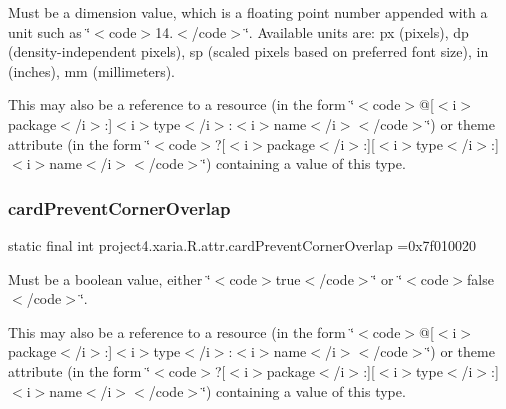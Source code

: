 Must be a dimension value, which is a floating point number appended with a unit such as \char`\"{}$<$code$>$14.\+5sp$<$/code$>$\char`\"{}. Available units are\+: px (pixels), dp (density-\/independent pixels), sp (scaled pixels based on preferred font size), in (inches), mm (millimeters). 

This may also be a reference to a resource (in the form \char`\"{}$<$code$>$@\mbox{[}$<$i$>$package$<$/i$>$\+:\mbox{]}$<$i$>$type$<$/i$>$\+:$<$i$>$name$<$/i$>$$<$/code$>$\char`\"{}) or theme attribute (in the form \char`\"{}$<$code$>$?\mbox{[}$<$i$>$package$<$/i$>$\+:\mbox{]}\mbox{[}$<$i$>$type$<$/i$>$\+:\mbox{]}$<$i$>$name$<$/i$>$$<$/code$>$\char`\"{}) containing a value of this type. \mbox{\label{classproject4_1_1xaria_1_1R_1_1attr_a132e2ec7f095af58a041f0d72eb92090}} 
\subsubsection{\texorpdfstring{card\+Prevent\+Corner\+Overlap}{cardPreventCornerOverlap}}
{\footnotesize\ttfamily static final int project4.\+xaria.\+R.\+attr.\+card\+Prevent\+Corner\+Overlap =0x7f010020\hspace{0.3cm}{\ttfamily [static]}}

Must be a boolean value, either \char`\"{}$<$code$>$true$<$/code$>$\char`\"{} or \char`\"{}$<$code$>$false$<$/code$>$\char`\"{}. 

This may also be a reference to a resource (in the form \char`\"{}$<$code$>$@\mbox{[}$<$i$>$package$<$/i$>$\+:\mbox{]}$<$i$>$type$<$/i$>$\+:$<$i$>$name$<$/i$>$$<$/code$>$\char`\"{}) or theme attribute (in the form \char`\"{}$<$code$>$?\mbox{[}$<$i$>$package$<$/i$>$\+:\mbox{]}\mbox{[}$<$i$>$type$<$/i$>$\+:\mbox{]}$<$i$>$name$<$/i$>$$<$/code$>$\char`\"{}) containing a value of this type. \mbox{\label{classproject4_1_1xaria_1_1R_1_1attr_aa77872e3131bbd9b60cdf49697b9fbce}} 
